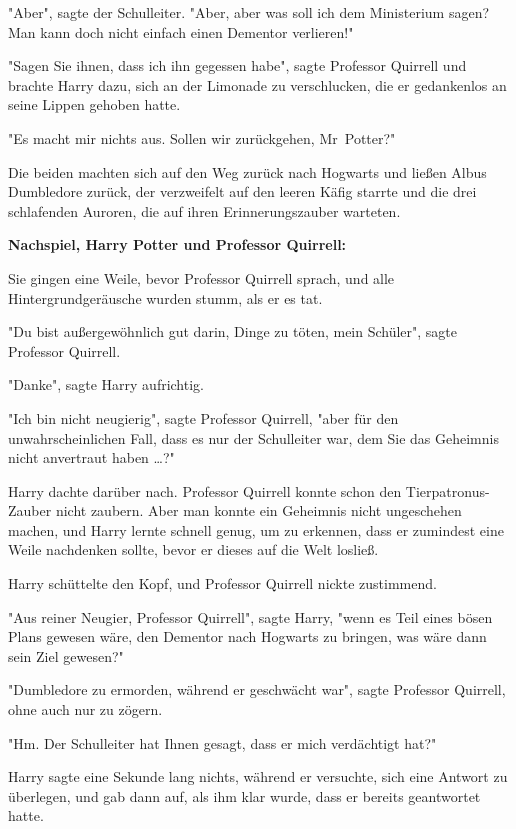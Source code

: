 {"Aber", sagte der Schulleiter. "Aber, aber was soll ich dem Ministerium sagen? Man kann doch nicht einfach einen Dementor verlieren!"

"Sagen Sie ihnen, dass ich ihn gegessen habe", sagte Professor Quirrell und brachte Harry dazu, sich an der Limonade zu verschlucken, die er gedankenlos an seine Lippen gehoben hatte.

"Es macht mir nichts aus. Sollen wir zurückgehen, Mr~Potter?"

Die beiden machten sich auf den Weg zurück nach Hogwarts und ließen Albus Dumbledore zurück, der verzweifelt auf den leeren Käfig starrte und die drei schlafenden Auroren, die auf ihren Erinnerungszauber warteten.

\textbf{Nachspiel, Harry Potter und Professor Quirrell:}

Sie gingen eine Weile, bevor Professor Quirrell sprach, und alle Hintergrundgeräusche wurden stumm, als er es tat.

"Du bist außergewöhnlich gut darin, Dinge zu töten, mein Schüler", sagte Professor Quirrell.

"Danke", sagte Harry aufrichtig.

"Ich bin nicht neugierig", sagte Professor Quirrell, "aber für den unwahrscheinlichen Fall, dass es nur der Schulleiter war, dem Sie das Geheimnis nicht anvertraut haben …?"

Harry dachte darüber nach. Professor Quirrell konnte schon den Tierpatronus-Zauber nicht zaubern. Aber man konnte ein Geheimnis nicht ungeschehen machen, und Harry lernte schnell genug, um zu erkennen, dass er zumindest eine Weile nachdenken sollte, bevor er dieses auf die Welt losließ.

Harry schüttelte den Kopf, und Professor Quirrell nickte zustimmend.

"Aus reiner Neugier, Professor Quirrell", sagte Harry, "wenn es Teil eines bösen Plans gewesen wäre, den Dementor nach Hogwarts zu bringen, was wäre dann sein Ziel gewesen?"

"Dumbledore zu ermorden, während er geschwächt war", sagte Professor Quirrell, ohne auch nur zu zögern.

"Hm. Der Schulleiter hat Ihnen gesagt, dass er mich verdächtigt hat?"

Harry sagte eine Sekunde lang nichts, während er versuchte, sich eine Antwort zu überlegen, und gab dann auf, als ihm klar wurde, dass er bereits geantwortet hatte.

}
